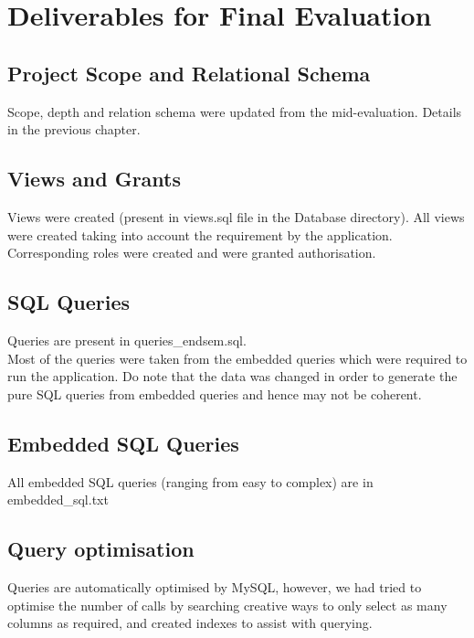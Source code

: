 \documentclass[12pt]{report}
\begin{document}
    
\chapter*{Deliverables for Final Evaluation}
    \section*{Project Scope and Relational Schema}
        Scope, depth and relation schema were updated from the mid-evaluation. Details in the previous chapter.
    
    \section*{Views and Grants}
        Views were created (present in views.sql file in the Database directory). All views were created taking into account the requirement by the application. Corresponding roles were created and were granted authorisation.

    \section*{SQL Queries}
        Queries are present in queries\_endsem.sql.\\
        Most of the queries were taken from the embedded queries which were required to run the application. Do note that the data was changed in order to generate the pure SQL queries from embedded queries and hence may not be coherent.

    \section*{Embedded SQL Queries}
        All embedded SQL queries (ranging from easy to complex) are in embedded\_sql.txt
    
    \section*{Query optimisation}
        Queries are automatically optimised by MySQL, however, we had tried to optimise the number of calls by searching creative ways to only select as many columns as required, and created indexes to assist with querying.
\end{document}
